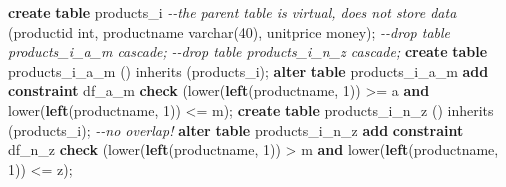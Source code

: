\documentclass[
  magyar,
]{article}
\newenvironment{Shaded}{}{}
\newcommand{\CommentTok}[1]{\textcolor[rgb]{0.38,0.63,0.69}{\textit{#1}}}
\newcommand{\DataTypeTok}[1]{\textcolor[rgb]{0.56,0.13,0.00}{#1}}
\newcommand{\DecValTok}[1]{\textcolor[rgb]{0.25,0.63,0.44}{#1}}
\newcommand{\FunctionTok}[1]{\textcolor[rgb]{0.02,0.16,0.49}{#1}}
\newcommand{\KeywordTok}[1]{\textcolor[rgb]{0.00,0.44,0.13}{\textbf{#1}}}
\newcommand{\NormalTok}[1]{#1}
\newcommand{\OperatorTok}[1]{\textcolor[rgb]{0.40,0.40,0.40}{#1}}
\newcommand{\StringTok}[1]{\textcolor[rgb]{0.25,0.44,0.63}{#1}}
\begin{document}
\begin{Shaded}
\begin{Highlighting}[]
\KeywordTok{create} \KeywordTok{table}\NormalTok{ products\_i }\CommentTok{{-}{-}the parent table is virtual, does not store data}
\NormalTok{   (productid }\DataTypeTok{int}\NormalTok{, productname }\DataTypeTok{varchar}\NormalTok{(}\DecValTok{40}\NormalTok{), unitprice money);}
\CommentTok{{-}{-}drop table products\_i\_a\_m cascade;}
\CommentTok{{-}{-}drop table products\_i\_n\_z cascade;}
\KeywordTok{create} \KeywordTok{table}\NormalTok{ products\_i\_a\_m () inherits (products\_i);}
\KeywordTok{alter} \KeywordTok{table}\NormalTok{ products\_i\_a\_m }\KeywordTok{add} \KeywordTok{constraint}\NormalTok{ df\_a\_m }\KeywordTok{check}\NormalTok{ (}\FunctionTok{lower}\NormalTok{(}\KeywordTok{left}\NormalTok{(productname, }\DecValTok{1}\NormalTok{)) }\OperatorTok{\textgreater{}=}
\StringTok{\textquotesingle{}a\textquotesingle{}} \KeywordTok{and} \FunctionTok{lower}\NormalTok{(}\KeywordTok{left}\NormalTok{(productname, }\DecValTok{1}\NormalTok{)) }\OperatorTok{\textless{}=} \StringTok{\textquotesingle{}m\textquotesingle{}}\NormalTok{);}
\KeywordTok{create} \KeywordTok{table}\NormalTok{ products\_i\_n\_z () inherits (products\_i);  }\CommentTok{{-}{-}no overlap!}
\KeywordTok{alter} \KeywordTok{table}\NormalTok{ products\_i\_n\_z }\KeywordTok{add} \KeywordTok{constraint}\NormalTok{ df\_n\_z }\KeywordTok{check}\NormalTok{ (}\FunctionTok{lower}\NormalTok{(}\KeywordTok{left}\NormalTok{(productname, }\DecValTok{1}\NormalTok{)) }\OperatorTok{\textgreater{}}
\StringTok{\textquotesingle{}m\textquotesingle{}} \KeywordTok{and} \FunctionTok{lower}\NormalTok{(}\KeywordTok{left}\NormalTok{(productname, }\DecValTok{1}\NormalTok{)) }\OperatorTok{\textless{}=} \StringTok{\textquotesingle{}z\textquotesingle{}}\NormalTok{);}


\end{Highlighting}
\end{Shaded}
\end{document}
